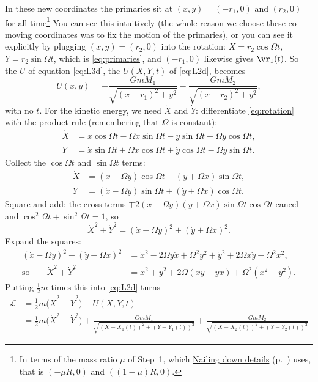 \documentclass[12pt]{article}
\numberwithin{equation}{section}
\newcommand{\Om}{\Omega}
\newcommand{\Lag}{\mathcal{L}}
\newcommand{\sideroadsp}{\hyperref[sec:sideroads]{Nailing down details} (p.~\pageref{sec:sideroads})}
\begin{document}
\noindent In these new coordinates the
primaries sit at $(x, y) = (-r_1, 0)$ and $(r_2, 0)$ for all time\footnote{In terms of the mass ratio $\mu$ of Step~1, which \sideroadsp{}
  uses, that is $(-\mu R, 0)$ and $((1-\mu)R, 0)$.} You can see this intuitively (the whole reason we choose
these co-moving coordinates was to fix the motion of the primaries), or you can
see it explicitly by plugging $(x,y) = (r_2, 0)$ into
the rotation: $X = r_2\cos\Om t$, $Y = r_2\sin\Om t$, which is
\eqref{eq:primaries}, and $(-r_1, 0)$ likewise gives $\vr_1(t)$. So the $U$ of
equation \eqref{eq:L3d}, the $U(X, Y, t)$ of \eqref{eq:L2d}, becomes
\begin{equation}
  \label{eq:U2d}
  U(x, y) = -\frac{GmM_1}{\sqrt{(x + r_1)^2 + y^2}} - \frac{GmM_2}{\sqrt{(x - r_2)^2 + y^2}},
\end{equation}
with no $t$. For the kinetic energy, we need $\dot X$ and $\dot Y$: differentiate \eqref{eq:rotation} with the
product rule (remembering that $\Om$ is constant):
\begin{align*}
  \dot X &= \dot x\cos\Om t - \Om x\sin\Om t - \dot y\sin\Om t - \Om y\cos\Om t , \\
  \dot Y &= \dot x\sin\Om t + \Om x\cos\Om t + \dot y\cos\Om t - \Om y\sin\Om t .
\end{align*}
Collect the $\cos\Om t$ and $\sin\Om t$ terms:
\begin{align*}
  \dot X &= (\dot x - \Om y)\cos\Om t - (\dot y + \Om x)\sin\Om t , \\
  \dot Y &= (\dot x - \Om y)\sin\Om t + (\dot y + \Om x)\cos\Om t .
\end{align*}
Square and add: the cross terms $\mp 2(\dot x - \Om y)(\dot y + \Om x)\sin\Om t\cos\Om t$ cancel
and $\cos^2\Om t + \sin^2\Om t = 1$, so
\begin{equation*}
  \dot X^2 + \dot Y^2 = (\dot x - \Om y)^2 + (\dot y + \Om x)^2 .
\end{equation*}
Expand the squares:
\begin{align*}
  (\dot x - \Om y)^2 + (\dot y + \Om x)^2
  &= \dot x^2 - 2\Om y\dot x + \Om^2 y^2 + \dot y^2 + 2\Om x\dot y + \Om^2 x^2 , \\
  \text{so}\qquad \dot X^2 + \dot Y^2 &= \dot x^2 + \dot y^2 + 2\Om(x\dot y - y\dot x) + \Om^2(x^2 + y^2) .
\end{align*}
Putting $\tfrac12 m$ times this into \eqref{eq:L2d} turns
\begin{align*}
  \Lag &= \tfrac12 m\bigl(\dot X^2 + \dot Y^2\bigr) - U(X, Y, t) \\
  &= \tfrac12 m\bigl(\dot X^2 + \dot Y^2\bigr)
  + \frac{GmM_1}{\sqrt{(X - X_1(t))^2 + (Y - Y_1(t))^2}}
  + \frac{GmM_2}{\sqrt{(X - X_2(t))^2 + (Y - Y_2(t))^2}}
\end{align*}
\end{document}
